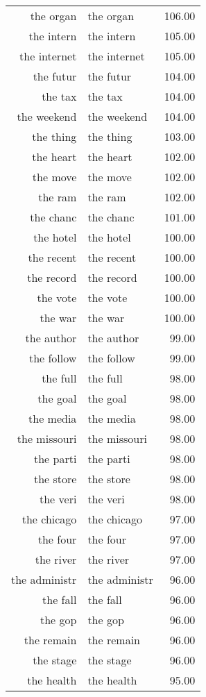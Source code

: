 \begin{table}[ht]
\begin{tabular}{rlr}
  the organ & the organ & 106.00 \\ 
  the intern & the intern & 105.00 \\ 
  the internet & the internet & 105.00 \\ 
  the futur & the futur & 104.00 \\ 
  the tax & the tax & 104.00 \\ 
  the weekend & the weekend & 104.00 \\ 
  the thing & the thing & 103.00 \\ 
  the heart & the heart & 102.00 \\ 
  the move & the move & 102.00 \\ 
  the ram & the ram & 102.00 \\ 
  the chanc & the chanc & 101.00 \\ 
  the hotel & the hotel & 100.00 \\ 
  the recent & the recent & 100.00 \\ 
  the record & the record & 100.00 \\ 
  the vote & the vote & 100.00 \\ 
  the war & the war & 100.00 \\ 
  the author & the author & 99.00 \\ 
  the follow & the follow & 99.00 \\ 
  the full & the full & 98.00 \\ 
  the goal & the goal & 98.00 \\ 
  the media & the media & 98.00 \\ 
  the missouri & the missouri & 98.00 \\ 
  the parti & the parti & 98.00 \\ 
  the store & the store & 98.00 \\ 
  the veri & the veri & 98.00 \\ 
  the chicago & the chicago & 97.00 \\ 
  the four & the four & 97.00 \\ 
  the river & the river & 97.00 \\ 
  the administr & the administr & 96.00 \\ 
  the fall & the fall & 96.00 \\ 
  the gop & the gop & 96.00 \\ 
  the remain & the remain & 96.00 \\ 
  the stage & the stage & 96.00 \\ 
  the health & the health & 95.00 \\ 

\end{tabular}
\end{table}
